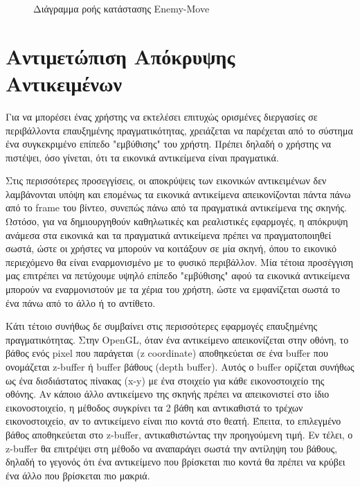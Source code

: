 \begin{figure}[H]
    \caption[Διάγραμμα ροής κατάστασης Enemy-Move]{Διάγραμμα ροής κατάστασης Enemy-Move}
    \label{fig:enemy_move}
\end{figure}


\section{Αντιμετώπιση Απόκρυψης Αντικειμένων} \label{s:occlusion}



Για να μπορέσει ένας χρήστης να εκτελέσει επιτυχώς ορισμένες διεργασίες σε περιβάλλοντα επαυξημένης πραγματικότητας, χρειάζεται να παρέχεται από το σύστημα ένα συγκεκριμένο επίπεδο "εμβύθισης" του χρήστη. Πρέπει δηλαδή ο χρήστης να πιστέψει, όσο γίνεται, ότι τα εικονικά αντικείμενα είναι πραγματικά. 


Στις περισσότερες προσεγγίσεις, οι αποκρύψεις των εικονικών αντικειμένων δεν λαμβάνονται υπόψη και επομένως τα εικονικά αντικείμενα απεικονίζονται πάντα πάνω από το frame του βίντεο, συνεπώς πάνω από τα πραγματικά αντικείμενα της σκηνής. 
Ωστόσο, για να δημιουργηθούν καθηλωτικές και ρεαλιστικές εφαρμογές, η απόκρυψη ανάμεσα στα εικονικά και τα πραγματικά αντικείμενα πρέπει να πραγματοποιηθεί σωστά, ώστε οι χρήστες να μπορούν να κοιτάξουν σε μία σκηνή, όπου το εικονικό περιεχόμενο θα είναι εναρμονισμένο με το φυσικό περιβάλλον. Μία τέτοια προσέγγιση μας επιτρέπει να πετύχουμε υψηλό επίπεδο "εμβύθισης" αφού τα εικονικά αντικείμενα μπορούν να εναρμονιστούν με τα χέρια του χρήστη, ώστε να εμφανίζεται σωστά το ένα πάνω από το άλλο ή το αντίθετο. 

Κάτι τέτοιο συνήθως δε συμβαίνει στις περισσότερες εφαρμογές επαυξημένης πραγματικότητας. Στην OpenGL, όταν ένα αντικείμενο απεικονίζεται στην οθόνη, το βάθος ενός pixel που παράγεται (z coordinate) αποθηκεύεται σε ένα buffer που ονομάζεται z-buffer ή buffer βάθους (depth buffer). Αυτός ο buffer ορίζεται συνήθως ως ένα δισδιάστατος πίνακας (x-y) με ένα στοιχείο για κάθε εικονοστοιχείο της οθόνης. Αν κάποιο άλλο αντικείμενο της σκηνής πρέπει να απεικονιστεί στο ίδιο εικονοστοιχείο, η μέθοδος συγκρίνει τα 2 βάθη και αντικαθιστά το τρέχων εικονοστοιχείο, αν το αντικείμενο είναι πιο κοντά στο θεατή. Έπειτα, το επιλεγμένο βάθος αποθηκεύεται στο z-buffer, αντικαθιστώντας την προηγούμενη τιμή. Εν τέλει, ο z-buffer θα επιτρέψει στη μέθοδο να αναπαράγει σωστά την αντίληψη του βάθους, δηλαδή το γεγονός ότι ένα αντικείμενο που βρίσκεται πιο κοντά θα πρέπει να κρύβει ένα άλλο που βρίσκεται πιο μακριά.


